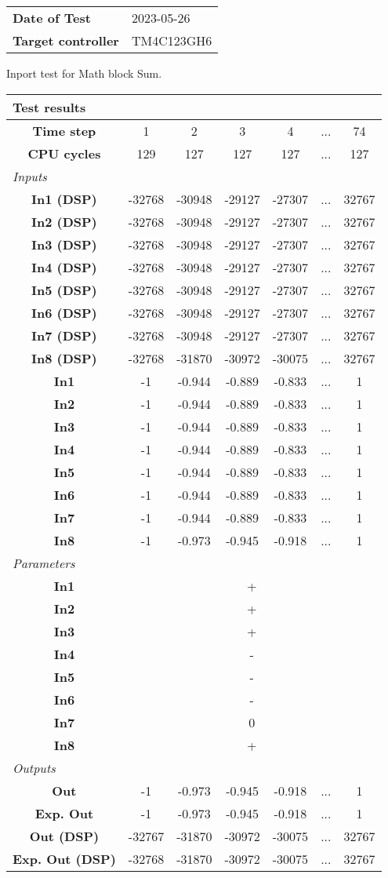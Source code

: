 \begin{tabular}{l l}
\textbf{Date of Test} & 2023-05-26 \tabularnewline
\textbf{Target controller} & TM4C123GH6 \tabularnewline
\end{tabular}
\vspace{1ex}
Inport test for Math block Sum.

\vspace{1em}
\begin{tabularx}{\textwidth}{|c|c|c|c|c|>{\centering\arraybackslash}X|c|}
\hline
\multicolumn{7}{|l|}{\cellcolor[gray]{0.8}\textbf{Test results}} \tabularnewline \hline
\textbf{Time step} & 1 & 2 & 3 & 4 & ... & 74 \tabularnewline \hline
\textbf{CPU cycles} & 129 & 127 & 127 & 127 & ... & 127 \tabularnewline \hline
\multicolumn{7}{|l|}{\cellcolor[gray]{0.9}\textit{Inputs}} \tabularnewline \hline
\textbf{In1 (DSP)} & -32768 & -30948 & -29127 & -27307 & ... & 32767 \tabularnewline \hline
\textbf{In2 (DSP)} & -32768 & -30948 & -29127 & -27307 & ... & 32767 \tabularnewline \hline
\textbf{In3 (DSP)} & -32768 & -30948 & -29127 & -27307 & ... & 32767 \tabularnewline \hline
\textbf{In4 (DSP)} & -32768 & -30948 & -29127 & -27307 & ... & 32767 \tabularnewline \hline
\textbf{In5 (DSP)} & -32768 & -30948 & -29127 & -27307 & ... & 32767 \tabularnewline \hline
\textbf{In6 (DSP)} & -32768 & -30948 & -29127 & -27307 & ... & 32767 \tabularnewline \hline
\textbf{In7 (DSP)} & -32768 & -30948 & -29127 & -27307 & ... & 32767 \tabularnewline \hline
\textbf{In8 (DSP)} & -32768 & -31870 & -30972 & -30075 & ... & 32767 \tabularnewline \hline
\textbf{In1} & -1 & -0.944 & -0.889 & -0.833 & ... & 1 \tabularnewline \hline
\textbf{In2} & -1 & -0.944 & -0.889 & -0.833 & ... & 1 \tabularnewline \hline
\textbf{In3} & -1 & -0.944 & -0.889 & -0.833 & ... & 1 \tabularnewline \hline
\textbf{In4} & -1 & -0.944 & -0.889 & -0.833 & ... & 1 \tabularnewline \hline
\textbf{In5} & -1 & -0.944 & -0.889 & -0.833 & ... & 1 \tabularnewline \hline
\textbf{In6} & -1 & -0.944 & -0.889 & -0.833 & ... & 1 \tabularnewline \hline
\textbf{In7} & -1 & -0.944 & -0.889 & -0.833 & ... & 1 \tabularnewline \hline
\textbf{In8} & -1 & -0.973 & -0.945 & -0.918 & ... & 1 \tabularnewline \hline
\multicolumn{7}{|l|}{\cellcolor[gray]{0.9}\textit{Parameters}} \tabularnewline \hline
\textbf{In1} & \multicolumn{6}{c|}{+} \tabularnewline \hline
\textbf{In2} & \multicolumn{6}{c|}{+} \tabularnewline \hline
\textbf{In3} & \multicolumn{6}{c|}{+} \tabularnewline \hline
\textbf{In4} & \multicolumn{6}{c|}{-} \tabularnewline \hline
\textbf{In5} & \multicolumn{6}{c|}{-} \tabularnewline \hline
\textbf{In6} & \multicolumn{6}{c|}{-} \tabularnewline \hline
\textbf{In7} & \multicolumn{6}{c|}{0} \tabularnewline \hline
\textbf{In8} & \multicolumn{6}{c|}{+} \tabularnewline \hline
\multicolumn{7}{|l|}{\cellcolor[gray]{0.9}\textit{Outputs}} \tabularnewline \hline
\textbf{Out} & -1 & -0.973 & -0.945 & -0.918 & ... & 1 \tabularnewline \hline
\textbf{Exp. Out} & -1 & -0.973 & -0.945 & -0.918 & ... & 1 \tabularnewline \hline
\textbf{Out (DSP)} & -32767 & -31870 & -30972 & -30075 & ... & 32767 \tabularnewline \hline
\textbf{Exp. Out (DSP)} & -32768 & -31870 & -30972 & -30075 & ... & 32767 \tabularnewline \hline
\end{tabularx}
